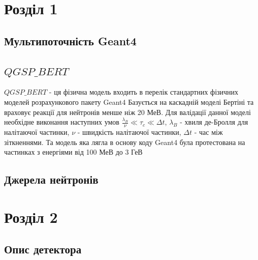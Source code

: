 \documentclass[a4paper, 14pt]{article}
\numberwithin{equation}{section}
\numberwithin{table}{section}
\begin{document}
\newpage
\tableofcontents
\newpage
\pagestyle{plain}
\setcounter{page}{2}
	

\newpage
\section{Розділ 1}
\setcounter{figure}{0} 
\subsection{Мультипоточність Geant4}

\subsection{$QGSP\_BERT$}
	$QGSP\_BERT$ - ця фізична модель входить в перелік стандартних фізичних моделей розрахункового пакету Geant4
	Базується на каскадній моделі Бертіні та враховує реакції для нейтронів менше ніж 20 МеВ. Для валідації данної моделі необхідне виконання наступних умов $\frac{\lambda_B}{\nu} \ll \tau_c \ll \Delta{t}$, $\lambda_B$ - хвиля де-Бролля для налітаючої частинки, $\nu$ - швидкість налітаючої частинки, $\Delta{t}$ - час між зіткненнями. Та модель яка лягла в основу коду Geant4 була протестована на частинках з енергіями від 100 МеВ до 3 ГеВ
\subsection{Джерела нейтронів}

\newpage
\section{Розділ 2}
\setcounter{figure}{0}
\subsection{Опис детектора}
	
\end{document}
